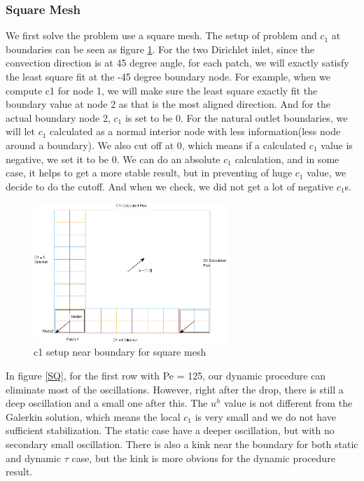 \documentclass[10pt]{article}
\begin{document}
\subsubsection{Square Mesh}
We first solve the problem use a square mesh. The setup of problem and $c_1$ at boundaries can be seen as figure \ref{SQmesh}. For the two Dirichlet inlet, since the convection direction is at 45 degree angle, for each patch, we will exactly satisfy the least square fit at the -45 degree boundary node. For example, when we compute c1 for node 1, we will make sure the least square exactly fit the boundary value at node 2 as that is the most aligned direction. And for the actual boundary node 2, $c_1$ is set to be 0. For the natural outlet boundaries, we will let $c_1$ calculated as a normal interior node with less information(less node around a boundary). We also cut off at 0, which means if a calculated $c_1$ value is negative, we set it to be 0. We can do an absolute $c_1$ calculation, and in some case, it helps to get a more stable result, but in preventing of huge $c_1$ value, we decide to do the cutoff. And when we check, we did not get a lot of negative $c_1$s.\\
\begin{figure}[h!]
	\begin{center}
	\includegraphics[width=0.65\textwidth, clip]{./figure/SQmeshGrid.eps}
	\end{center}
		\vspace{0mm}
    \caption{c1 setup near boundary for square mesh}
  	\label{SQmesh}
\end{figure}
In figure \ref{SQ}, for the first row with Pe = 125, our dynamic procedure can eliminate most of the oscillations. However, right after the drop, there is still a deep oscillation and a small one after this. The $u^h$ value is not different from the Galerkin solution, which means the local $c_1$ is very small and we do not have sufficient stabilization. The static case have a deeper oscillation, but with no secondary small oscillation. There is also a kink near the boundary for both static and dynamic $\tau$ case, but the kink is more obvious for the dynamic procedure result.\\
\end{document}
